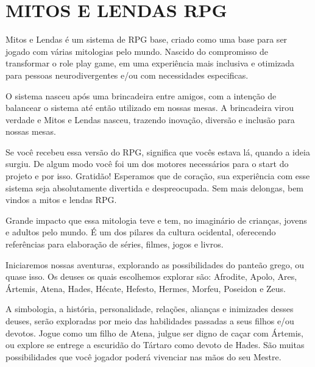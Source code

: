 
\newenvironment{Introducao}{%
}{%
}

\begin{Introducao}
\section{MITOS E LENDAS RPG}

Mitos e Lendas é um sistema de RPG base, criado como uma base para ser jogado com várias mitologias pelo mundo. Nascido do compromisso de transformar o role play game, em uma experiência mais inclusiva e otimizada para pessoas neurodivergentes e/ou com necessidades especificas.

O sistema nasceu após uma brincadeira entre amigos, com a intenção de balancear o sistema até então utilizado em nossas mesas. A brincadeira virou verdade e Mitos e Lendas nasceu, trazendo inovação, diversão e inclusão para nossas mesas.

Se você recebeu essa versão do RPG, significa que vocês estava lá, quando a ideia surgiu. De algum modo você foi um dos motores necessários para o start do projeto e por isso. Gratidão! Esperamos que de coração, sua experiência com esse sistema seja absolutamente divertida e despreocupada. Sem mais delongas, bem vindos a mitos e lendas RPG.

Grande impacto que essa mitologia teve e tem, no imaginário de crianças, jovens e adultos pelo mundo. É um dos pilares da cultura ocidental, oferecendo referências para elaboração de séries, filmes, jogos e livros.

Iniciaremos nossas aventuras, explorando as possibilidades do panteão grego, ou quase isso. Os deuses os quais escolhemos explorar são: Afrodite, Apolo, Ares, Ártemis, Atena, Hades, Hécate, Hefesto, Hermes, Morfeu, Poseidon e Zeus.

A simbologia, a história, personalidade, relações, alianças e inimizades desses deuses, serão exploradas por meio das habilidades passadas a seus filhos e/ou devotos. Jogue como um filho de Atena, julgue ser digno de caçar com Ártemis, ou explore se entrege a escuridão do Tártaro como devoto de Hades. São muitas possibilidades que você jogador poderá vivenciar nas mãos do seu Mestre.
    
\end{Introducao}



